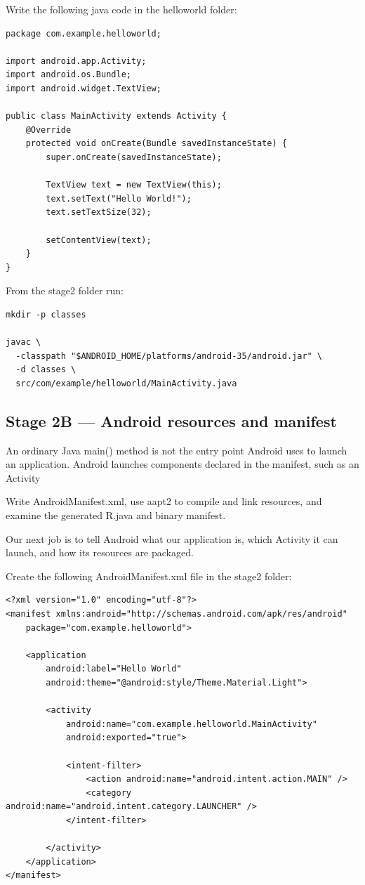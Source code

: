 \documentclass[11pt]{article}
\begin{document}
Write the following java code in the helloworld folder:
\begin{verbatim}
package com.example.helloworld;

import android.app.Activity;
import android.os.Bundle;
import android.widget.TextView;

public class MainActivity extends Activity {
    @Override
    protected void onCreate(Bundle savedInstanceState) {
        super.onCreate(savedInstanceState);

        TextView text = new TextView(this);
        text.setText("Hello World!");
        text.setTextSize(32);

        setContentView(text);
    }
}
\end{verbatim}

From the stage2 folder run:
\begin{verbatim}
mkdir -p classes

javac \
  -classpath "$ANDROID_HOME/platforms/android-35/android.jar" \
  -d classes \
  src/com/example/helloworld/MainActivity.java
\end{verbatim}
\subsection{Stage 2B — Android resources and manifest}
\label{sec:org50ad3bc}

An ordinary Java main() method is not the entry point Android
uses to launch an application. Android launches components
declared in the manifest, such as an Activity 

Write AndroidManifest.xml, use aapt2 to compile and link
resources, and examine the generated R.java and binary manifest. 

Our next job is to tell Android what our application is, which
Activity it can launch, and how its resources are packaged. 

Create the following AndroidManifest.xml file in the stage2
folder:
\begin{verbatim}
<?xml version="1.0" encoding="utf-8"?>
<manifest xmlns:android="http://schemas.android.com/apk/res/android"
    package="com.example.helloworld">

    <application
        android:label="Hello World"
        android:theme="@android:style/Theme.Material.Light">

        <activity
            android:name="com.example.helloworld.MainActivity"
            android:exported="true">

            <intent-filter>
                <action android:name="android.intent.action.MAIN" />
                <category android:name="android.intent.category.LAUNCHER" />
            </intent-filter>

        </activity>
    </application>
</manifest>
\end{verbatim}
\end{document}
